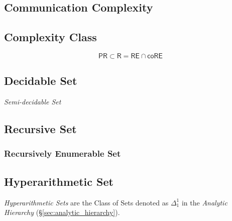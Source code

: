 \subsection{Communication Complexity}\label{sec:communication_complexity}

\subsection{Complexity Class}\label{sec:complexity_class}

\[
  \mathsf{PR} \subset \mathsf{R} = \mathsf{RE} \cap \mathsf{coRE}
\]



\subsection{Decidable Set}\label{sec:decidable_set}

\emph{Semi-decidable Set}



\subsection{Recursive Set}\label{sec:recursive_set}

\subsubsection{Recursively Enumerable Set}\label{sec:recursively_enumerable}



\subsection{Hyperarithmetic Set}\label{sec:hyperarithmetic_set}

\emph{Hyperarithmetic Sets} are the Class of Sets denoted as
$\Delta^1_1$ in the \emph{Analytic Hierarchy}
(\S\ref{sec:analytic_hierarchy}).



